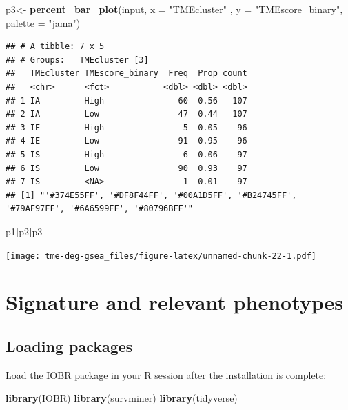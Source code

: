 \documentclass[
  12pt,
]{book}
\newenvironment{Shaded}{\begin{snugshade}}{\end{snugshade}}
\newcommand{\AttributeTok}[1]{\textcolor[rgb]{0.13,0.29,0.53}{#1}}
\newcommand{\FunctionTok}[1]{\textcolor[rgb]{0.13,0.29,0.53}{\textbf{#1}}}
\newcommand{\NormalTok}[1]{#1}
\newcommand{\OtherTok}[1]{\textcolor[rgb]{0.56,0.35,0.01}{#1}}
\newcommand{\SpecialCharTok}[1]{\textcolor[rgb]{0.81,0.36,0.00}{\textbf{#1}}}
\newcommand{\StringTok}[1]{\textcolor[rgb]{0.31,0.60,0.02}{#1}}
\begin{document}
\begin{Shaded}
\begin{Highlighting}[]
\NormalTok{p3}\OtherTok{\textless{}{-}} \FunctionTok{percent\_bar\_plot}\NormalTok{(input, }\AttributeTok{x =} \StringTok{"TMEcluster"}\NormalTok{ , }\AttributeTok{y =} \StringTok{"TMEscore\_binary"}\NormalTok{, }\AttributeTok{palette =} \StringTok{"jama"}\NormalTok{)}
\end{Highlighting}
\end{Shaded}

\begin{verbatim}
## # A tibble: 7 x 5
## # Groups:   TMEcluster [3]
##   TMEcluster TMEscore_binary  Freq  Prop count
##   <chr>      <fct>           <dbl> <dbl> <dbl>
## 1 IA         High               60  0.56   107
## 2 IA         Low                47  0.44   107
## 3 IE         High                5  0.05    96
## 4 IE         Low                91  0.95    96
## 5 IS         High                6  0.06    97
## 6 IS         Low                90  0.93    97
## 7 IS         <NA>                1  0.01    97
## [1] "'#374E55FF', '#DF8F44FF', '#00A1D5FF', '#B24745FF', '#79AF97FF', '#6A6599FF', '#80796BFF'"
\end{verbatim}

\begin{Shaded}
\begin{Highlighting}[]
\NormalTok{p1}\SpecialCharTok{|}\NormalTok{p2}\SpecialCharTok{|}\NormalTok{p3}
\end{Highlighting}
\end{Shaded}

\texttt{[image: tme-deg-gsea\_files/figure-latex/unnamed-chunk-22-1.pdf]}

\hypertarget{signature-and-relevant-phenotypes}{%
\chapter{\texorpdfstring{\textbf{Signature and relevant phenotypes}}{Signature and relevant phenotypes}}\label{signature-and-relevant-phenotypes}}

\hypertarget{loading-packages-2}{%
\section{Loading packages}\label{loading-packages-2}}

Load the IOBR package in your R session after the installation is complete:

\begin{Shaded}
\begin{Highlighting}[]
\FunctionTok{library}\NormalTok{(IOBR)}
\FunctionTok{library}\NormalTok{(survminer)}
\FunctionTok{library}\NormalTok{(tidyverse)}
\end{Highlighting}
\end{Shaded}
\end{document}
